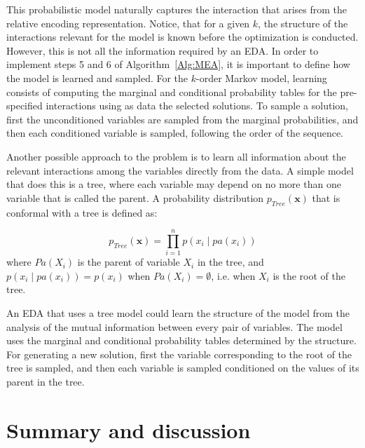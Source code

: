This probabilistic model naturally captures the interaction that arises from the relative encoding representation. Notice, that for a given $k$, the structure of the interactions relevant for the model is known before the optimization is conducted.  However, this is not all the information required by an EDA. In order to implement steps 5 and 6 of Algorithm~\ref{Alg:MEA}, it is important to define how the model is learned and sampled. For the  $k$-order Markov model, learning consists of computing the marginal and conditional probability tables for the pre-specified interactions using as data the selected solutions.  To sample a solution, first the unconditioned variables are sampled from the marginal probabilities, and then each conditioned variable is sampled, following the order of the sequence. 


 Another possible approach to the problem is to learn all information about the relevant interactions among the variables directly from the data. A simple model that does this is a tree,  where each variable  may depend on no more than one variable that is called the parent. A probability distribution $p_{Tree}(\textbf{x})$ that is conformal with a tree is defined as:

\begin{equation}
   p_{Tree} (\textbf{x}) =\prod_{i=1}^{n} p(x_i \mid pa(x_i))  \label{eq:T-Tree}
\end{equation}
where $Pa(X_i)$  is the parent of variable $X_i$ in the tree, and $p(x_i \mid pa(x_i))=p(x_i)$ when $Pa(X_i)=\emptyset$, i.e. when $X_i$ is the root of the tree.

An EDA that uses a tree model \cite{Baluja_and_Davies:1997} could learn the structure of the model from the analysis of the mutual information between every pair of variables. The model uses the marginal and conditional probability tables determined by the structure. For generating a new solution, first the variable corresponding to the root of the tree is sampled, and then each variable is sampled conditioned on the values of its parent in the tree. 

 \section{Summary and discussion} \label{sec:Summary}


